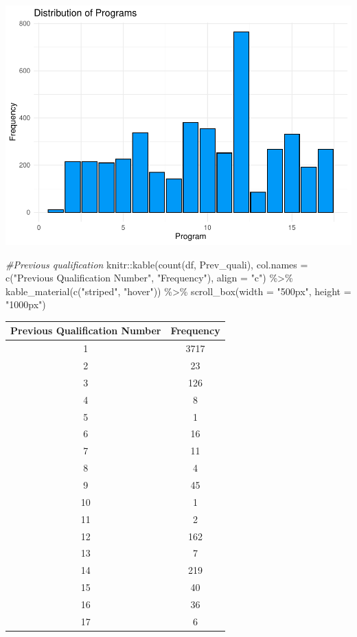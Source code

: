 \documentclass[
]{article}
\newenvironment{Shaded}{\begin{snugshade}}{\end{snugshade}}
\newcommand{\AttributeTok}[1]{\textcolor[rgb]{0.77,0.63,0.00}{#1}}
\newcommand{\CommentTok}[1]{\textcolor[rgb]{0.56,0.35,0.01}{\textit{#1}}}
\newcommand{\FunctionTok}[1]{\textcolor[rgb]{0.00,0.00,0.00}{#1}}
\newcommand{\NormalTok}[1]{#1}
\newcommand{\SpecialCharTok}[1]{\textcolor[rgb]{0.00,0.00,0.00}{#1}}
\newcommand{\StringTok}[1]{\textcolor[rgb]{0.31,0.60,0.02}{#1}}
\begin{document}
\includegraphics{midterm_files/figure-latex/unnamed-chunk-7-1.pdf}

\begin{Shaded}
\begin{Highlighting}[]
\CommentTok{\#Previous qualification}
\NormalTok{knitr}\SpecialCharTok{::}\FunctionTok{kable}\NormalTok{(}\FunctionTok{count}\NormalTok{(df, }\StringTok{\textquotesingle{}Prev\_quali\textquotesingle{}}\NormalTok{), }\AttributeTok{col.names =} \FunctionTok{c}\NormalTok{(}\StringTok{"Previous Qualification Number"}\NormalTok{, }\StringTok{"Frequency"}\NormalTok{), }\AttributeTok{align =} \StringTok{"c"}\NormalTok{) }\SpecialCharTok{\%\textgreater{}\%}
  \FunctionTok{kable\_material}\NormalTok{(}\FunctionTok{c}\NormalTok{(}\StringTok{"striped"}\NormalTok{, }\StringTok{"hover"}\NormalTok{)) }\SpecialCharTok{\%\textgreater{}\%} 
 \FunctionTok{scroll\_box}\NormalTok{(}\AttributeTok{width =} \StringTok{"500px"}\NormalTok{, }\AttributeTok{height =} \StringTok{"1000px"}\NormalTok{)}
\end{Highlighting}
\end{Shaded}

\begin{table}
\centering
\begin{tabular}{c|c}
\hline
Previous Qualification Number & Frequency\\
\hline
1 & 3717\\
\hline
2 & 23\\
\hline
3 & 126\\
\hline
4 & 8\\
\hline
5 & 1\\
\hline
6 & 16\\
\hline
7 & 11\\
\hline
8 & 4\\
\hline
9 & 45\\
\hline
10 & 1\\
\hline
11 & 2\\
\hline
12 & 162\\
\hline
13 & 7\\
\hline
14 & 219\\
\hline
15 & 40\\
\hline
16 & 36\\
\hline
17 & 6\\
\hline
\end{tabular}
\end{table}
\end{document}

